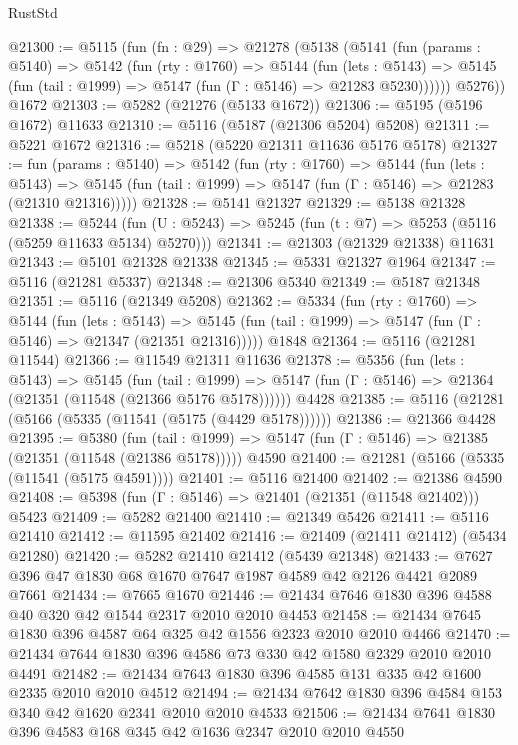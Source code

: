 \begin{lexlean}{RustStd}
\begin{coremodule}
{\begin{coremodule}
{{{{{{{{{{{{{{{{{{{{{{{{{{{{{{{@21300 := @5115
    (fun (fn : @29) =>
    @21278
      (@5138
        (@5141
          (fun (params : @5140) =>
          @5142
            (fun (rty : @1760) =>
            @5144
              (fun (lets : @5143) =>
              @5145 (fun (tail : @1999) => @5147 (fun (Γ : @5146) => @21283 @5230))))))
        @5276))
    @1672
@21303 := @5282 (@21276 (@5133 @1672))
@21306 := @5195 (@5196 @1672) @11633
@21310 := @5116 (@5187 (@21306 @5204) @5208)
@21311 := @5221 @1672
@21316 := @5218 (@5220 @21311 @11636 @5176 @5178)
@21327 := fun (params : @5140) =>
  @5142
    (fun (rty : @1760) =>
    @5144
      (fun (lets : @5143) =>
      @5145 (fun (tail : @1999) => @5147 (fun (Γ : @5146) => @21283 (@21310 @21316)))))
@21328 := @5141 @21327
@21329 := @5138 @21328
@21338 := @5244
    (fun (U : @5243) => @5245 (fun (t : @7) => @5253 (@5116 (@5259 @11633 @5134) @5270)))
@21341 := @21303 (@21329 @21338) @11631
@21343 := @5101 @21328 @21338
@21345 := @5331 @21327 @1964
@21347 := @5116 (@21281 @5337)
@21348 := @21306 @5340
@21349 := @5187 @21348
@21351 := @5116 (@21349 @5208)
@21362 := @5334
    (fun (rty : @1760) =>
    @5144
      (fun (lets : @5143) =>
      @5145 (fun (tail : @1999) => @5147 (fun (Γ : @5146) => @21347 (@21351 @21316)))))
    @1848
@21364 := @5116 (@21281 @11544)
@21366 := @11549 @21311 @11636
@21378 := @5356
    (fun (lets : @5143) =>
    @5145
      (fun (tail : @1999) =>
      @5147 (fun (Γ : @5146) => @21364 (@21351 (@11548 (@21366 @5176 @5178))))))
    @4428
@21385 := @5116 (@21281 (@5166 (@5335 (@11541 (@5175 (@4429 @5178))))))
@21386 := @21366 @4428
@21395 := @5380
    (fun (tail : @1999) => @5147 (fun (Γ : @5146) => @21385 (@21351 (@11548 (@21386 @5178)))))
    @4590
@21400 := @21281 (@5166 (@5335 (@11541 (@5175 @4591))))
@21401 := @5116 @21400
@21402 := @21386 @4590
@21408 := @5398 (fun (Γ : @5146) => @21401 (@21351 (@11548 @21402))) @5423
@21409 := @5282 @21400
@21410 := @21349 @5426
@21411 := @5116 @21410
@21412 := @11595 @21402
@21416 := @21409 (@21411 @21412) (@5434 @21280)
@21420 := @5282 @21410 @21412 (@5439 @21348)
@21433 := @7627 @396 @47 @1830 @68 @1670 @7647 @1987 @4589 @42 @2126 @4421 @2089 @7661
@21434 := @7665 @1670
@21446 := @21434 @7646 @1830 @396 @4588 @40 @320 @42 @1544 @2317 @2010 @2010 @4453
@21458 := @21434 @7645 @1830 @396 @4587 @64 @325 @42 @1556 @2323 @2010 @2010 @4466
@21470 := @21434 @7644 @1830 @396 @4586 @73 @330 @42 @1580 @2329 @2010 @2010 @4491
@21482 := @21434 @7643 @1830 @396 @4585 @131 @335 @42 @1600 @2335 @2010 @2010 @4512
@21494 := @21434 @7642 @1830 @396 @4584 @153 @340 @42 @1620 @2341 @2010 @2010 @4533
@21506 := @21434 @7641 @1830 @396 @4583 @168 @345 @42 @1636 @2347 @2010 @2010 @4550
}}}}}}}}}}}}}}}}}}}}}}}}}}}}}}}
\end{coremodule}}
\end{coremodule}
\end{lexlean}
